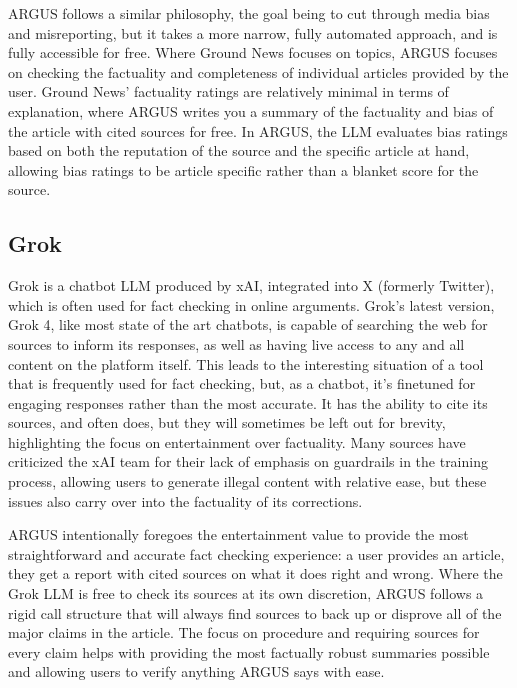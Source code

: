 \documentclass[conference]{IEEEtran}
\begin{document}
ARGUS follows a similar philosophy, the goal being to cut through media bias and misreporting, but it takes a more narrow, fully automated approach, and is fully accessible for free. Where Ground News focuses on topics, ARGUS focuses on checking the factuality and completeness of individual articles provided by the user. Ground News' factuality ratings are relatively minimal in terms of explanation, where ARGUS writes you a summary of the factuality and bias of the article with cited sources for free. In ARGUS, the LLM evaluates bias ratings based on both the reputation of the source and the specific article at hand, allowing bias ratings to be article specific rather than a blanket score for the source.

\subsection{Grok}
Grok is a chatbot LLM produced by xAI, integrated into X (formerly Twitter), which is often used for fact checking in online arguments\cite{esteban_ponce_de_leon_grok_2025}. Grok's latest version, Grok 4, like most state of the art chatbots, is capable of searching the web for sources to inform its responses, as well as having live access to any and all content on the platform itself. This leads to the interesting situation of a tool that is frequently used for fact checking, but, as a chatbot, it's finetuned for engaging responses rather than the most accurate. It has the ability to cite its sources, and often does, but they will sometimes be left out for brevity,  highlighting the focus on entertainment over factuality\cite{Grok4}. Many sources have criticized the xAI team for their lack of emphasis on guardrails in the training process, allowing users to generate illegal content with relative ease, but these issues also carry over into the factuality of its corrections\cite{MediumGrokGuardrails}.

ARGUS intentionally foregoes the entertainment value to provide the most straightforward and accurate fact checking experience: a user provides an article, they get a report with cited sources on what it does right and wrong. Where the Grok LLM is free to check its sources at its own discretion, ARGUS follows a rigid call structure that will always find sources to back up or disprove all of the major claims in the article. The focus on procedure and requiring sources for every claim helps with providing the most factually robust summaries possible and allowing users to verify anything ARGUS says with ease. 
\end{document}
